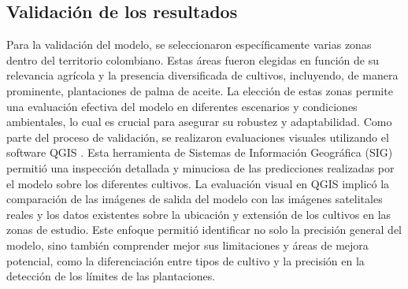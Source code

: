 \subsection{Validación de los resultados}
Para la validación del modelo, se seleccionaron específicamente varias zonas dentro del territorio colombiano. Estas áreas fueron elegidas en función de su relevancia agrícola y la presencia diversificada de cultivos, incluyendo, de manera prominente, plantaciones de palma de aceite. La elección de estas zonas permite una evaluación efectiva del modelo en diferentes escenarios y condiciones ambientales, lo cual es crucial para asegurar su robustez y adaptabilidad. Como parte del proceso de validación, se realizaron evaluaciones visuales utilizando el software QGIS \cite{QGIS_software}. Esta herramienta de Sistemas de Información Geográfica (SIG) permitió una inspección detallada y minuciosa de las predicciones realizadas por el modelo sobre los diferentes cultivos. La evaluación visual en QGIS implicó la comparación de las imágenes de salida del modelo con las imágenes satelitales reales y los datos existentes sobre la ubicación y extensión de los cultivos en las zonas de estudio. Este enfoque permitió identificar no solo la precisión general del modelo, sino también comprender mejor sus limitaciones y áreas de mejora potencial, como la diferenciación entre tipos de cultivo y la precisión en la detección de los límites de las plantaciones.
